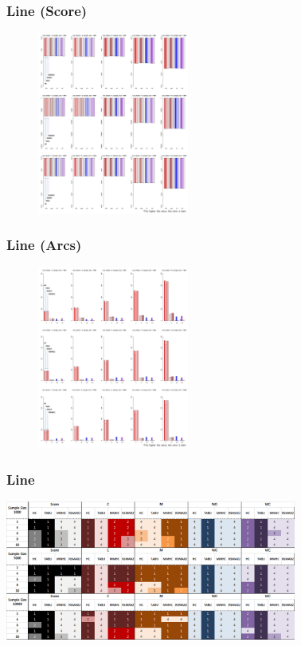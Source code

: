 \documentclass{beamer}
\begin{document}
\begin{frame}
\frametitle{Line (Score)}
{\scriptsize{}
	\begin{figure}
		\includegraphics[height=170pt]{images/02_Line_Score}
	\end{figure}	
}
\end{frame}


\begin{frame}
\frametitle{Line (Arcs)}
{\scriptsize{}
	\begin{figure}
		\includegraphics[height=170pt]{images/02_Line_Arcs}
	\end{figure}	
}
\end{frame}



\begin{frame}
\frametitle{Line}
{\scriptsize{}
	\begin{center}
		\includegraphics[height=130pt]{images/Result_Line}
	\end{center}
}
\end{frame}
\end{document}
